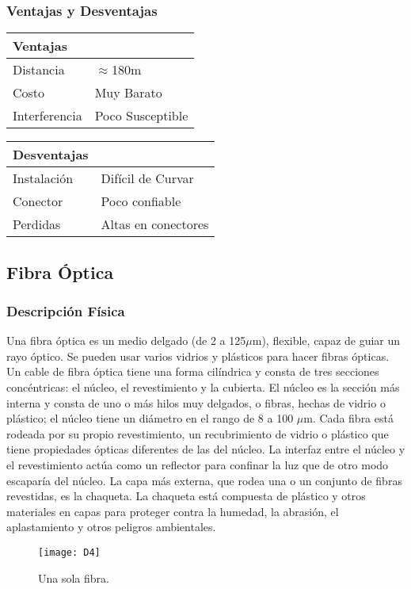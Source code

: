 \subsubsection{Ventajas y Desventajas}
\begin{center}
\begin{tabular}{*2l}
\toprule
Ventajas &   {} \\
\midrule
Distancia   & $\approx$180m   \\
Costo   &  Muy Barato \\
Interferencia   &  Poco Susceptible \\
\bottomrule
\end{tabular}
\quad
\begin{tabular}{*2l}
\toprule
Desventajas &   {} \\
\midrule
Instalación   & Difícil de Curvar   \\
Conector   &  Poco confiable \\
Perdidas   &  Altas en conectores \\
\bottomrule
\end{tabular}
\end{center}
\subsection{Fibra Óptica}
\subsubsection{Descripción Física}
Una fibra óptica es un medio delgado (de 2 a 125$\mu$m), flexible, capaz de guiar un rayo óptico. Se pueden usar varios vidrios y plásticos para hacer fibras ópticas. Un cable de fibra óptica tiene una forma cilíndrica y consta de tres secciones concéntricas: el núcleo, el revestimiento y la cubierta. El núcleo es la sección más interna y consta de uno o más hilos muy delgados, o fibras, hechas de vidrio o plástico; el núcleo tiene un diámetro en el rango de 8 a 100 $\mu$m. Cada fibra está rodeada por su propio revestimiento, un recubrimiento de vidrio o plástico que tiene propiedades ópticas diferentes de las del núcleo. La interfaz entre el núcleo y el revestimiento actúa como un reflector para confinar la luz que de otro modo escaparía del núcleo. La capa más externa, que rodea una o un conjunto de fibras revestidas, es la chaqueta. La chaqueta está compuesta de plástico y otros materiales en capas para proteger contra la humedad, la abrasión, el aplastamiento y otros peligros ambientales.
\begin{figure}[!ht]
\centering
\texttt{[image: D4]}
\caption{Una sola fibra.}
\end{figure}
